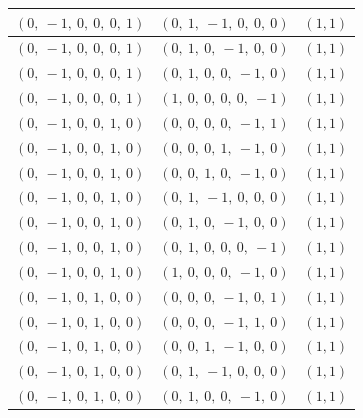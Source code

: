\documentclass[11pt]{article}
\theoremstyle{definition}
\begin{document}
\begin{center}
\begin{tabular}{|l|l|c|}
    \hline
    $\left( 0, \  -1, \  0, \  0, \  0, \  1\right)$ & $\left( 0, \  1, \  -1, \  0, \  0, \  0\right)$ & $(1,1)$ \\
    \hline
    $\left( 0, \  -1, \  0, \  0, \  0, \  1\right)$ & $\left( 0, \  1, \  0, \  -1, \  0, \  0\right)$ & $(1,1)$ \\
    \hline
    $\left( 0, \  -1, \  0, \  0, \  0, \  1\right)$ & $\left( 0, \  1, \  0, \  0, \  -1, \  0\right)$ & $(1,1)$ \\
    \hline
    $\left( 0, \  -1, \  0, \  0, \  0, \  1\right)$ & $\left( 1, \  0, \  0, \  0, \  0, \  -1\right)$ & $(1,1)$ \\
    \hline
    $\left( 0, \  -1, \  0, \  0, \  1, \  0\right)$ & $\left( 0, \  0, \  0, \  0, \  -1, \  1\right)$ & $(1,1)$ \\
    \hline
    $\left( 0, \  -1, \  0, \  0, \  1, \  0\right)$ & $\left( 0, \  0, \  0, \  1, \  -1, \  0\right)$ & $(1,1)$ \\
    \hline
    $\left( 0, \  -1, \  0, \  0, \  1, \  0\right)$ & $\left( 0, \  0, \  1, \  0, \  -1, \  0\right)$ & $(1,1)$ \\
    \hline
    $\left( 0, \  -1, \  0, \  0, \  1, \  0\right)$ & $\left( 0, \  1, \  -1, \  0, \  0, \  0\right)$ & $(1,1)$ \\
    \hline
    $\left( 0, \  -1, \  0, \  0, \  1, \  0\right)$ & $\left( 0, \  1, \  0, \  -1, \  0, \  0\right)$ & $(1,1)$ \\
    \hline
    $\left( 0, \  -1, \  0, \  0, \  1, \  0\right)$ & $\left( 0, \  1, \  0, \  0, \  0, \  -1\right)$ & $(1,1)$ \\
    \hline
    $\left( 0, \  -1, \  0, \  0, \  1, \  0\right)$ & $\left( 1, \  0, \  0, \  0, \  -1, \  0\right)$ & $(1,1)$ \\
    \hline
    $\left( 0, \  -1, \  0, \  1, \  0, \  0\right)$ & $\left( 0, \  0, \  0, \  -1, \  0, \  1\right)$ & $(1,1)$ \\
    \hline
    $\left( 0, \  -1, \  0, \  1, \  0, \  0\right)$ & $\left( 0, \  0, \  0, \  -1, \  1, \  0\right)$ & $(1,1)$ \\
    \hline
    $\left( 0, \  -1, \  0, \  1, \  0, \  0\right)$ & $\left( 0, \  0, \  1, \  -1, \  0, \  0\right)$ & $(1,1)$ \\
    \hline
    $\left( 0, \  -1, \  0, \  1, \  0, \  0\right)$ & $\left( 0, \  1, \  -1, \  0, \  0, \  0\right)$ & $(1,1)$ \\
    \hline
    $\left( 0, \  -1, \  0, \  1, \  0, \  0\right)$ & $\left( 0, \  1, \  0, \  0, \  -1, \  0\right)$ & $(1,1)$ \\

\end{tabular}
\end{center}
\end{document}
